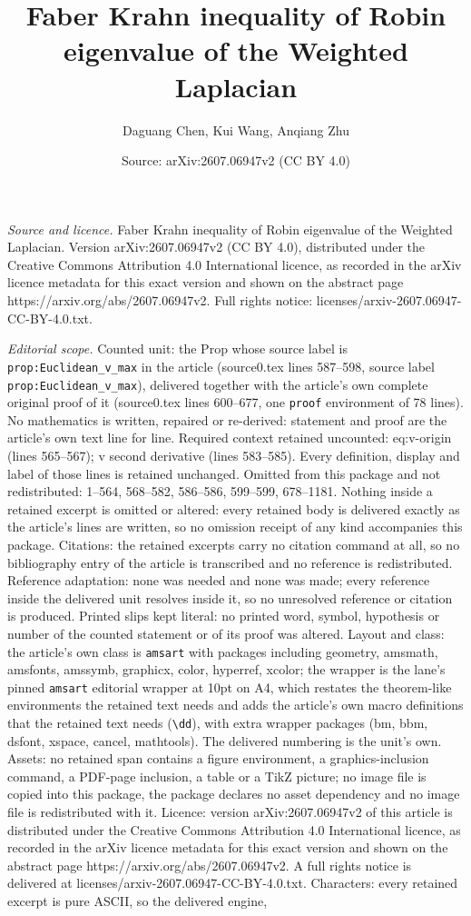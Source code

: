 \documentclass[10pt,a4paper]{amsart}
\title[Faber Krahn inequality of Robin eigenvalue of the Weighted L]{Faber Krahn inequality of Robin eigenvalue of the Weighted Laplacian}
\author{Daguang Chen, Kui Wang, Anqiang Zhu}
\date{Source: arXiv:2607.06947v2 (CC BY 4.0)}
\begin{document}
\maketitle

\noindent\emph{Source and licence.} Faber Krahn inequality of Robin eigenvalue of the Weighted Laplacian. Version arXiv:2607.06947v2 (CC BY 4.0), distributed under the Creative Commons Attribution 4.0 International licence, as recorded in the arXiv licence metadata for this exact version and shown on the abstract page https://arxiv.org/abs/2607.06947v2. Full rights notice: licenses/arxiv-2607.06947-CC-BY-4.0.txt.\par\smallskip

\noindent\textit{Editorial scope.} Counted unit: the Prop whose source label is \texttt{prop:Euclidean\_v\_max} in the article (source0.tex lines 587--598, source label \texttt{prop:Euclidean\_v\_max}), delivered together with the article's own complete original proof of it (source0.tex lines 600--677, one \texttt{proof} environment of 78 lines). No mathematics is written, repaired or re-derived: statement and proof are the article's own text line for line. Required context retained uncounted: eq:v-origin (lines 565--567); v second derivative (lines 583--585). Every definition, display and label of those lines is retained unchanged. Omitted from this package and not redistributed: 1--564, 568--582, 586--586, 599--599, 678--1181. Nothing inside a retained excerpt is omitted or altered: every retained body is delivered exactly as the article's lines are written, so no omission receipt of any kind accompanies this package. Citations: the retained excerpts carry no citation command at all, so no bibliography entry of the article is transcribed and no reference is redistributed. Reference adaptation: none was needed and none was made; every reference inside the delivered unit resolves inside it, so no unresolved reference or citation is produced. Printed slips kept literal: no printed word, symbol, hypothesis or number of the counted statement or of its proof was altered. Layout and class: the article's own class is \texttt{amsart} with packages including geometry, amsmath, amsfonts, amssymb, graphicx, color, hyperref, xcolor; the wrapper is the lane's pinned \texttt{amsart} editorial wrapper at 10pt on A4, which restates the theorem-like environments the retained text needs and adds the article's own macro definitions that the retained text needs (\texttt{\textbackslash dd}), with extra wrapper packages (bm, bbm, dsfont, xspace, cancel, mathtools). The delivered numbering is the unit's own. Assets: no retained span contains a figure environment, a graphics-inclusion command, a PDF-page inclusion, a table or a TikZ picture; no image file is copied into this package, the package declares no asset dependency and no image file is redistributed with it. Licence: version arXiv:2607.06947v2 of this article is distributed under the Creative Commons Attribution 4.0 International licence, as recorded in the arXiv licence metadata for this exact version and shown on the abstract page https://arxiv.org/abs/2607.06947v2. A full rights notice is delivered at licenses/arxiv-2607.06947-CC-BY-4.0.txt. Characters: every retained excerpt is pure ASCII, so the delivered engine, 
\end{document}
